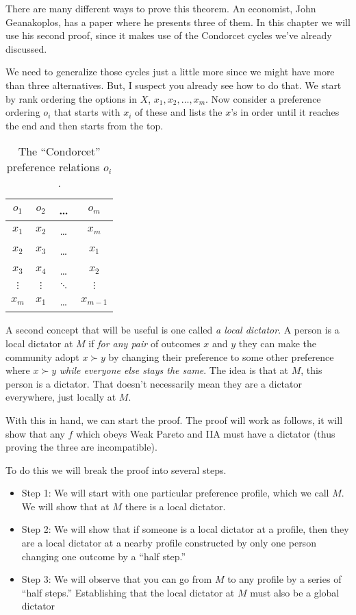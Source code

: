 There are many different ways to prove this theorem.  An economist, John Geanakoplos, has a paper where he presents three of them.  In this chapter we will use his second proof, since it makes use of the Condorcet cycles we've already discussed. 

We need to generalize those cycles just a little more since we might have more than three alternatives.  But, I suspect you already see how to do that.  We start by rank ordering the options in $X$, $x_1, x_2, \dots, x_m$.  Now consider a preference ordering $o_i$ that starts with $x_i$ of these and lists the $x$'s in order until it reaches the end and then starts from the top. 
\begin{table}
\centering
    \begin{tabular}{cccc}
    \toprule
    $o_1$ & $o_2$ & \dots & $o_m$ \\
    \midrule
    $x_1$ & $x_2$ & \dots & $x_m$ \\
    $x_2$ & $x_3$ & \dots & $x_1$ \\
    $x_3$ & $x_4$ & \dots & $x_2$ \\
    $\vdots$ & $\vdots$ & $\ddots$ & $\vdots$ \\
    $x_m$ & $x_1$ & \dots & $x_{m-1}$ \\
    \bottomrule
    \end{tabular}
    \medskip
    \caption{The ``Condorcet'' preference relations $o_i$.}
    \label{sc-oi}
\end{table}

A second concept that will be useful is one called {\it a local dictator}. A person is a local dictator at $M$ if {\it for any pair} of outcomes $x$ and $y$ they can make the community adopt $x \succ y$ by changing their preference to some other preference where $x \succ y$ {\it while everyone else stays the same}.  The idea is that at $M$, this person is a dictator.  That doesn't necessarily mean they are a dictator everywhere, just locally at $M$.

With this in hand, we can start the proof.  The proof will work as follows, it will show that any $f$ which obeys Weak Pareto and IIA must have a dictator (thus proving the three are incompatible).

To do this we will break the proof into several steps.
\begin{itemize}
    \item Step 1: We will start with one particular preference profile, which we call $M$.  We will show that at $M$ there is a local dictator.
    \item Step 2: We will show that if someone is a local dictator at a profile, then they are a local dictator at a nearby profile constructed by only one person changing one outcome by a ``half step.''
    \item Step 3: We will observe that you can go from $M$ to any profile by a series of ``half steps.'' Establishing that the local dictator at $M$ must also be a global dictator
\end{itemize}

